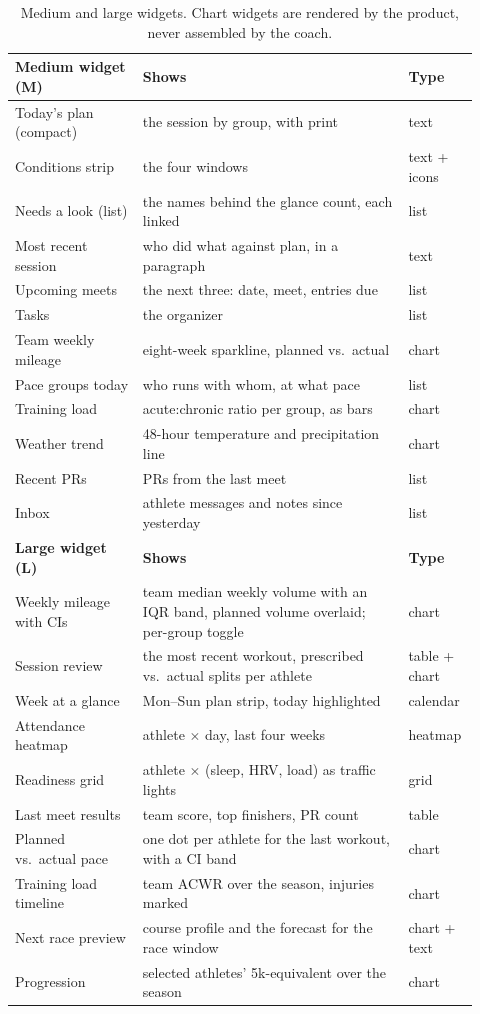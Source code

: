\documentclass[11pt]{article}
\begin{document}
\begin{table}[tbp]
\centering\small
\begin{tabular}{@{}p{0.26\linewidth}p{0.54\linewidth}>{\raggedright\arraybackslash}p{0.12\linewidth}@{}}
\toprule
\textbf{Medium widget (M)} & \textbf{Shows} & \textbf{Type}\\
\midrule
Today's plan (compact) & the session by group, with print & text\\
Conditions strip & the four windows & text + icons\\
Needs a look (list) & the names behind the glance count, each linked & list\\
Most recent session & who did what against plan, in a paragraph & text\\
Upcoming meets & the next three: date, meet, entries due & list\\
Tasks & the organizer & list\\
Team weekly mileage & eight-week sparkline, planned vs.\ actual & chart\\
Pace groups today & who runs with whom, at what pace & list\\
Training load & acute:chronic ratio per group, as bars & chart\\
Weather trend & 48-hour temperature and precipitation line & chart\\
Recent PRs & PRs from the last meet & list\\
Inbox & athlete messages and notes since yesterday & list\\
\midrule
\textbf{Large widget (L)} & \textbf{Shows} & \textbf{Type}\\
\midrule
Weekly mileage with CIs & team median weekly volume with an IQR band, planned volume overlaid; per-group toggle & chart\\
Session review & the most recent workout, prescribed vs.\ actual splits per athlete & table + chart\\
Week at a glance & Mon--Sun plan strip, today highlighted & calendar\\
Attendance heatmap & athlete $\times$ day, last four weeks & heatmap\\
Readiness grid & athlete $\times$ (sleep, HRV, load) as traffic lights & grid\\
Last meet results & team score, top finishers, PR count & table\\
Planned vs.\ actual pace & one dot per athlete for the last workout, with a CI band & chart\\
Training load timeline & team ACWR over the season, injuries marked & chart\\
Next race preview & course profile and the forecast for the race window & chart + text\\
Progression & selected athletes' 5k-equivalent over the season & chart\\
\bottomrule
\end{tabular}
\caption{Medium and large widgets. Chart widgets are rendered by the product,
never assembled by the coach.}
\label{tab:widgets}
\end{table}
\end{document}
